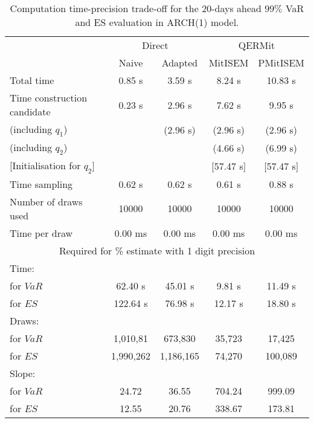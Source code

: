 { \renewcommand{\arraystretch}{1.3} 
\begin{table}[h] 
\centering 
\caption{Computation time-precision trade-off for the 20-days ahead  $99\%$ VaR and ES evaluation in ARCH(1) model.} 
\label{tab:time_precision_arch} 
\begin{tabular}{lcccc}  
  & \multicolumn{2}{c}{Direct} & \multicolumn{2}{c}{QERMit}  \\ \cline{2-5} 
  & Naive & Adapted & MitISEM & PMitISEM  \\ \hline 
Total time & 0.85 s & 3.59 s & 8.24 s & 10.83 s \\ 
Time construction candidate & 0.23 s & 2.96 s & 7.62 s & 9.95 s \\ 
 (including $q_{1}$) &   &  (2.96 s) & (2.96 s) & (2.96 s) \\ 
 (including $q_{2}$) &   &  & (4.66 s) & (6.99 s) \\ 
$[$Initialisation for $q_{2}$$]$&   &   & $[$57.47 s$]$ & $[$57.47 s$]$ \\ 
Time sampling & 0.62 s & 0.62 s & 0.61 s & 0.88 s  \\  
Number of draws used & 10000 & 10000 & 10000 & 10000 \\ 
Time per draw & 0.00 ms & 0.00 ms & 0.00 ms & 0.00 ms \\ \hline 
\multicolumn{5}{c}{Required for \% estimate with 1 digit precision} \\ \hline 
Time: &  &  &   &  \\ 
\hspace{1cm} for $VaR$ & 62.40 s & 45.01 s & 9.81 s & 11.49 s \\ 
\hspace{1cm} for $ES$ & 122.64 s & 76.98 s & 12.17 s & 18.80 s \\ 
Draws: &  &  &   &  \\ 
\hspace{1cm} for $VaR$ & 1,010,81 & 673,830  & 35,723  & 17,425  \\ 
\hspace{1cm} for $ES$ & 1,990,262 & 1,186,165  & 74,270   & 100,089  \\ 
\hline 
Slope: &  &  &   &  \\ 
\hspace{1cm} for $VaR$ & 24.72 & 36.55  & 704.24  & 999.09  \\ 
\hspace{1cm} for $ES$ & 12.55 & 20.76  & 338.67   & 173.81  \\  \hline 
\end{tabular} 
\end{table} 
} 
